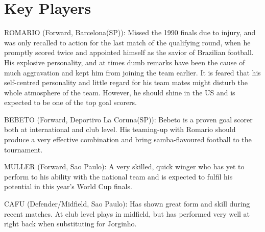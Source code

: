 \section{Key Players}
ROM{\’A}RIO (Forward, Barcelona(SP)):
Missed the 1990 finals due to injury, and was only recalled to action for the 
last match of the qualifying round, when he promptly scored twice and appointed
himself as the savior of Brazilian football. His explosive personality, and at
times dumb remarks have been the cause of much aggravation and kept him from 
joining the team earlier. It is feared that his self-centred personality and 
little regard for his team mates might disturb the whole atmosphere of the 
team. However, he should shine in the US and is expected to be one of the top 
goal scorers.

BEBETO (Forward, Deportivo La Coruna(SP)):
Bebeto is a proven goal scorer both at international and club level. His 
teaming-up with Romario should produce a very effective combination and bring 
samba-flavoured football to the tournament.

MULLER (Forward, Sao Paulo):
A very skilled, quick winger who has yet to perform to his ability with the 
national team and is expected to fulfil his potential in this year's World Cup
finals.

CAFU (Defender/Midfield, Sao Paulo):
Has shown great form and skill during recent matches. At club level plays in 
midfield, but has performed very well at right back when substituting for
Jorginho.

